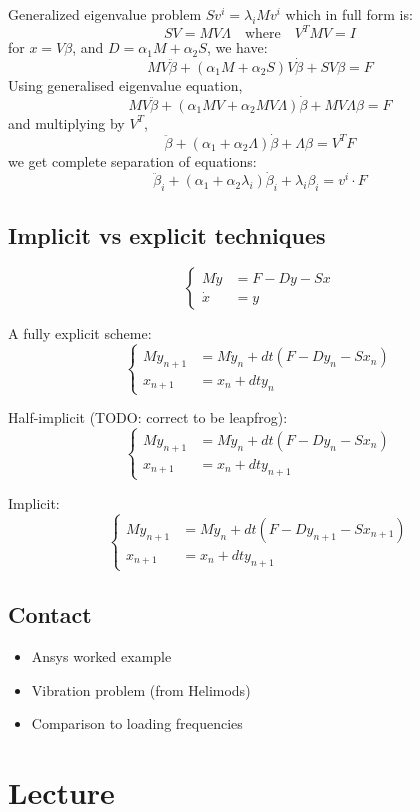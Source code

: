 \documentclass[12pt]{article}
\begin{document}
Generalized eigenvalue problem $Sv^i = \lambda_i Mv^i$ which in full form is:
\[SV = MV\Lambda\quad\text{where}\quad V^TMV=I\]
for $x = V\beta$, and $D=\alpha_1M+\alpha_2S$, we have:
\[MV\ddot\beta + (\alpha_1M+\alpha_2S)V\dot\beta + SV\beta = F\]
Using generalised eigenvalue equation,
\[MV\ddot\beta + (\alpha_1MV+\alpha_2MV\Lambda)\dot\beta + MV\Lambda\beta = F\]
and multiplying by $V^T$,
\[\ddot\beta + (\alpha_1+\alpha_2\Lambda)\dot\beta + \Lambda\beta = V^TF\]
we get complete separation of equations:
\[\ddot\beta_i + (\alpha_1+\alpha_2\lambda_i)\dot\beta_i + \lambda_i\beta_i = v^i\cdot F\]


\subsection{Implicit vs explicit techniques}
\[\begin{cases}
M\dot y &= F - Dy - Sx\\
\dot x &= y
\end{cases}\]

A fully explicit scheme:
\[\begin{cases}
M y_{n+1} &= M\dot y_n + dt(F - Dy_n - Sx_n)\\
x_{n+1} &= x_n + dt y_n
\end{cases}\]


Half-implicit (TODO: correct to be leapfrog):
\[\begin{cases}
M y_{n+1} &= M\dot y_n + dt(F - Dy_n - Sx_n)\\
x_{n+1} &= x_n + dt y_{n+1}
\end{cases}\]

Implicit:
\[\begin{cases}
M y_{n+1} &= M\dot y_n + dt(F - Dy_{n+1} - Sx_{n+1})\\
x_{n+1} &= x_n + dt y_{n+1}
\end{cases}\]

\newpage


\subsection*{Contact}
\begin{itemize}
\item Ansys worked example
\item Vibration problem (from Helimods)
\item Comparison to loading  frequencies
\end{itemize}

\section{Lecture}
\end{document}
